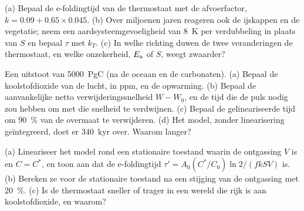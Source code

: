 \begin{exercise}[$\star\star\star$]\label{exo:b2:deep-time-climate:10}
(a) Bepaal de e-foldingtijd van de thermostaat met de afvoerfactor, $k = 0.09 + 0.65\times0.045$.
(b) Over miljoenen jaren reageren ook de ijskappen en de vegetatie; neem een
aardsysteemgevoeligheid van \qty{8}{K} per verdubbeling in plaats van $S$ en bepaal $\tau$ met $k_T$. (c) In welke richting duwen de
twee veranderingen de thermostaat, en welke onzekerheid, $E_{\text a}$ of $S$, weegt zwaarder?
\end{exercise}

\begin{exercise}[$\star\star\star$]\label{exo:b2:deep-time-climate:11}
Een uitstoot van \qty{5000}{PgC} (na de oceaan en de carbonaten). (a) Bepaal de koolstofdioxide van
de lucht, in ppm, en de opwarming. (b) Bepaal de aanvankelijke netto verwijderingssnelheid $W - W_0$, en de tijd die de
puls nodig zou hebben om met die snelheid te verdwijnen. (c) Bepaal de gelineariseerde tijd om \qty{90}{\percent}
van de overmaat te verwijderen. (d) Het model, zonder linearisering geïntegreerd, doet er \qty{340}{kyr} over. Waarom langer?
\end{exercise}

\begin{exercise}[$\star\star\star$]\label{exo:b2:deep-time-climate:12}
(a) Lineariseer het model rond een stationaire toestand waarin de ontgassing $V$ is en $C = C^*$, en toon aan dat
de e-foldingtijd $\tau' = A_0 (C^*/C_0)\ln 2/(f k S V)$ is. (b) Bereken ze voor de stationaire toestand
na een stijging van de ontgassing met \qty{20}{\percent}. (c) Is de thermostaat sneller of trager in een wereld die rijk is aan
koolstofdioxide, en waarom?
\end{exercise}

